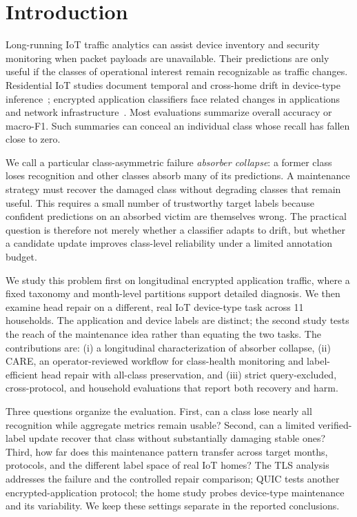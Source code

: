 \documentclass[journal]{IEEEtran}
\newcommand{\ours}{CARE}
\begin{document}
\section{Introduction}
\label{sec:intro}
Long-running IoT traffic analytics can assist device inventory and security monitoring when packet payloads are unavailable. Their predictions are only useful if the classes of operational interest remain recognizable as traffic changes. Residential IoT studies document temporal and cross-home drift in device-type inference~\cite{pashamokhtari2023dynamic,azizi2025labelshift,azizi2026budget}; encrypted application classifiers face related changes in applications and network infrastructure~\cite{soukup2025drift,malekghaini2023drift}. Most evaluations summarize overall accuracy or macro-F1. Such summaries can conceal an individual class whose recall has fallen close to zero.

We call a particular class-asymmetric failure \emph{absorber collapse}: a former class loses recognition and other classes absorb many of its predictions. A maintenance strategy must recover the damaged class without degrading classes that remain useful. This requires a small number of trustworthy target labels because confident predictions on an absorbed victim are themselves wrong. The practical question is therefore not merely whether a classifier adapts to drift, but whether a candidate update improves class-level reliability under a limited annotation budget.

We study this problem first on longitudinal encrypted application traffic, where a fixed taxonomy and month-level partitions support detailed diagnosis. We then examine head repair on a different, real IoT device-type task across 11 households. The application and device labels are distinct; the second study tests the reach of the maintenance idea rather than equating the two tasks. The contributions are: (i) a longitudinal characterization of absorber collapse, (ii) \ours{}, an operator-reviewed workflow for class-health monitoring and label-efficient head repair with all-class preservation, and (iii) strict query-excluded, cross-protocol, and household evaluations that report both recovery and harm.

Three questions organize the evaluation. First, can a class lose nearly all recognition while aggregate metrics remain usable? Second, can a limited verified-label update recover that class without substantially damaging stable ones? Third, how far does this maintenance pattern transfer across target months, protocols, and the different label space of real IoT homes? The TLS analysis addresses the failure and the controlled repair comparison; QUIC tests another encrypted-application protocol; the home study probes device-type maintenance and its variability. We keep these settings separate in the reported conclusions.
\end{document}
